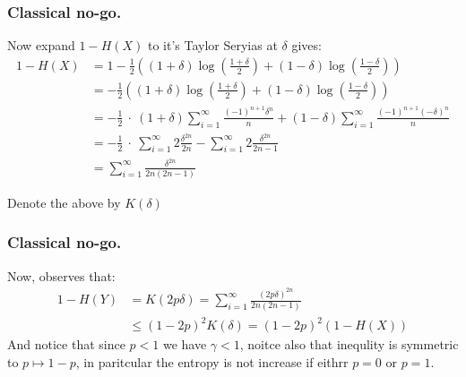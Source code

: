 \documentclass{beamer}
\begin{document}
\begin{frame}
  \frametitle{Classical no-go.}
Now expand $ 1 - H(X)$ to it's Taylor Seryias at $\delta$ gives: 
\begin{equation*}
  \begin{split}
  1 - H(X) &= 1 - \frac{1}{2} \left( \left( 1 + \delta \right) \log       \left( \frac{1 + \delta}{2} \right) + \left( 1 - \delta \right) \log       \left( \frac{1 - \delta}{2} \right) \right) \\ 
  &=- \frac{1}{2} \left( \left( 1 + \delta \right) \log       \left( \frac{1 + \delta}{2} \right) + \left( 1 - \delta \right) \log       \left( \frac{1 - \delta}{2} \right) \right) \\ 
  &= - \frac{1}{2} \ \cdot \  (1+ \delta) \sum_{i=1}^{\infty}{ \frac{(-1)^{n+1}\delta^{n}}{n} } +  (1- \delta) \sum_{i=1}^{\infty}{ \frac{(-1)^{n+1}(-\delta)^{n}}{n} }\\
&=  - \frac{1}{2} \ \cdot \   \sum_{i=1}^{\infty}{2 \frac{\delta^{2n}}{2n} }  - \sum_{i=1}^{\infty}{ 2\frac{\delta^{2n}}{2n-1} }\\ 
      &= \sum_{ i =1 }^{\infty} \frac{\delta^{2n} }{ 2n(2n-1)  } 
  \end{split}
\end{equation*}

Denote the above by $K(\delta)$

\end{frame}


\begin{frame}
  \frametitle{Classical no-go.}
  Now, observes that: 
  \begin{equation*}
    \begin{split}
      1 - H(Y) &= K(2p \delta) = \sum_{ i =1 }^{\infty} \frac{(2 p\delta)^{2n} }{ 2n(2n-1)  }\\
      &\le ( 1 -2p)^{2}K(\delta) = ( 1 - 2p)^{2}( 1 - H(X) )
    \end{split}
  \end{equation*}
  And notice that since $p < 1$ we have $\gamma < 1$, noitce also that inequlity is symmetric to $p \mapsto 1 - p$, in paritcular the entropy is not increase if eithrr $p =0$ or $p=1$.
\end{frame}  
\end{document}
